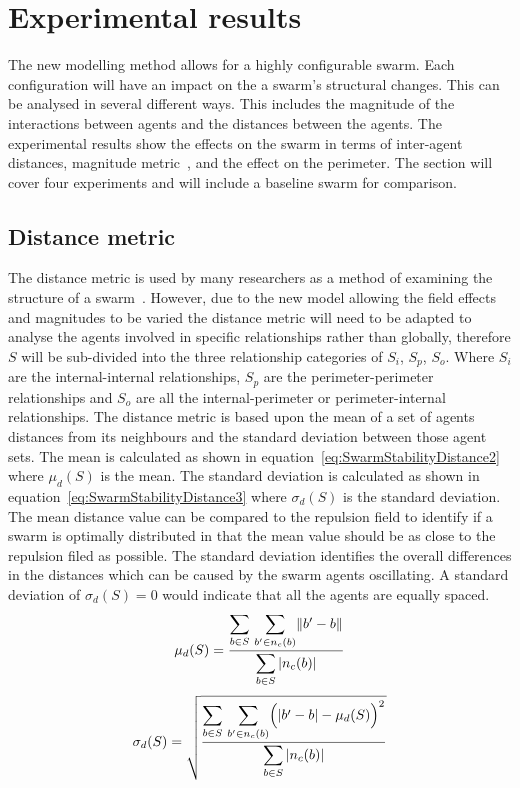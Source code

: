 \documentclass[12pt,a4paper]{IEEEtran}
\newcommand{\magn}[1]{\Vert{#1}\Vert}
\newcommand{\card}[1]{\vert{#1}\vert}
\newcommand{\vbb}[2]{#2-#1}
\begin{document}
\section{Experimental results\label{sec:ExperimentalResults}}
The new modelling method allows for a highly configurable swarm. Each configuration will have an impact on the a swarm's structural changes. This can be analysed in several different ways. This includes the magnitude of the interactions between agents and the distances between the agents. The experimental results show the effects on the swarm in terms of inter-agent distances, magnitude metric~\cite{eliot2018metric}, and the effect on the perimeter. The section will cover four experiments and will include a baseline swarm for comparison.

\subsection{Distance metric}
The distance metric is used by many researchers as a method of examining the structure of a swarm~\cite{BAFVM:06,BAF:06,elamvazhuthi2015optimal,VG:05,SW:03}. However, due to the new model allowing the field effects and magnitudes to be varied the distance metric will need to be adapted to analyse the agents involved in specific relationships rather than globally, therefore $S$ will be sub-divided into the three relationship categories of $S_i$, $S_p$, $S_{o}$. Where $S_i$ are the internal-internal relationships, $S_p$ are the perimeter-perimeter relationships and $S_{o}$ are all the internal-perimeter or perimeter-internal relationships. 
The distance metric is based upon the mean of a set of agents distances from its neighbours and the standard deviation between those agent sets. The mean is calculated as shown in equation~\ref{eq:SwarmStabilityDistance2} where $\mu_d(S)$ is the mean. The standard deviation is calculated as shown in equation~\ref{eq:SwarmStabilityDistance3} where $\sigma_d(S)$ is the standard deviation. The mean distance value can be compared to the repulsion field to identify if a swarm is optimally distributed in that the mean value should be as close to the repulsion filed as possible. The standard deviation identifies the overall differences in the distances which can be caused by the swarm agents oscillating. A standard deviation of $\sigma_d(S) = 0$ would indicate that all the agents are equally spaced.
\small
\begin{equation}
\label{eq:SwarmStabilityDistance2}
\mu_d(S) = \frac{\mathlarger{\sum_{b \in S}}~\mathlarger{\sum_{b' \in n_c(b)}}\magn{\vbb{b}{b'}}}{\mathlarger{\sum_{b \in S}\card{n_c(b)}}}
\end{equation}
\normalsize
\small
\begin{equation}
\label{eq:SwarmStabilityDistance3}
\sigma_d(S) = \sqrt{\frac{\mathlarger{\sum_{b \in S}}~\mathlarger{\sum_{b' \in n_c(b)}}\Big(\card{\vbb{b}{b'}} - \mu_d(S)\Big)^2}{\mathlarger{\sum_{b \in S}\card{n_c(b)}}}}
\end{equation}
\normalsize
\end{document}
